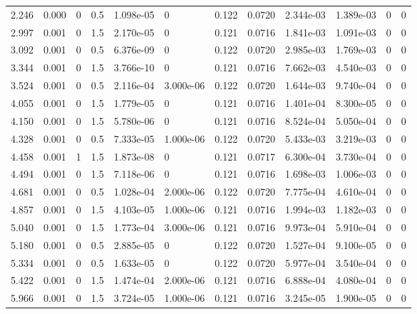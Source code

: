 \documentclass[preview]{standalone}
\begin{document}
{{\begin{tabular}{L{1.2cm}C{1.2cm} C{0.3cm}C{0.5cm} C{1.4cm}C{1.4cm} C{1.4cm}C{1.4cm} C{1.6cm}C{1.6cm} C{1.6cm}C{1.6cm}}
  2.246  &  0.000  & 0     & 0.5 &  1.098e-05  & 0  &  0.122&   0.0720& 2.344e-03 & 1.389e-03   &  0 & 0  \\ 
  2.997  &  0.001  & 0     & 1.5 &  2.170e-05  & 0  &  0.121&   0.0716& 1.841e-03 & 1.091e-03   &  0 & 0  \\ 
  3.092  &  0.001  & 0     & 0.5 &  6.376e-09  & 0  &  0.122&   0.0720& 2.985e-03 & 1.769e-03   &  0 & 0  \\ 
  3.344  &  0.001  & 0     & 1.5 &  3.766e-10  & 0  &  0.121&   0.0716& 7.662e-03 & 4.540e-03   &  0 & 0  \\ 
  3.524  &  0.001  & 0     & 0.5 &  2.116e-04  & 3.000e-06  &  0.122&   0.0720& 1.644e-03 & 9.740e-04   &  0 & 0  \\ 
  4.055  &  0.001  & 0     & 1.5 &  1.779e-05  & 0  &  0.121&   0.0716& 1.401e-04 & 8.300e-05   &  0 & 0  \\ 
  4.150  &  0.001  & 0     & 1.5 &  5.780e-06  & 0  &  0.121&   0.0716& 8.524e-04 & 5.050e-04   &  0 & 0  \\ 
  4.328  &  0.001  & 0     & 0.5 &  7.333e-05  & 1.000e-06  &  0.122&   0.0720& 5.433e-03 & 3.219e-03   &  0 & 0  \\ 
  4.458  &  0.001  & 1     & 1.5 &  1.873e-08  & 0  &  0.121&   0.0717& 6.300e-04 & 3.730e-04   &  0 & 0  \\ 
  4.494  &  0.001  & 0     & 1.5 &  7.118e-06  & 0  &  0.121&   0.0716& 1.698e-03 & 1.006e-03   &  0 & 0  \\ 
  4.681  &  0.001  & 0     & 0.5 &  1.028e-04  & 2.000e-06  &  0.122&   0.0720& 7.775e-04 & 4.610e-04   &  0 & 0  \\ 
  4.857  &  0.001  & 0     & 1.5 &  4.103e-05  & 1.000e-06  &  0.121&   0.0716& 1.994e-03 & 1.182e-03   &  0 & 0  \\ 
  5.040  &  0.001  & 0     & 1.5 &  1.773e-04  & 3.000e-06  &  0.121&   0.0716& 9.973e-04 & 5.910e-04   &  0 & 0  \\ 
  5.180  &  0.001  & 0     & 0.5 &  2.885e-05  & 0  &  0.122&   0.0720& 1.527e-04 & 9.100e-05   &  0 & 0  \\ 
  5.334  &  0.001  & 0     & 0.5 &  1.633e-05  & 0  &  0.122&   0.0720& 5.977e-04 & 3.540e-04   &  0 & 0  \\ 
  5.422  &  0.001  & 0     & 1.5 &  1.474e-04  & 2.000e-06  &  0.121&   0.0716& 6.888e-04 & 4.080e-04   &  0 & 0  \\ 
  5.966  &  0.001  & 0     & 1.5 &  3.724e-05  & 1.000e-06  &  0.121&   0.0716& 3.245e-05 & 1.900e-05   &  0 & 0  \\ 

\end{tabular}}}
\end{document}
